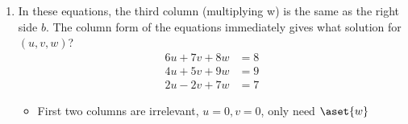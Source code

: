 \begin{itemize}
\begin{enumerate}[resume]
      \item In these equations, the third column (multiplying w) is the same as
        the right side \(b\). The column form of the equations immediately
        gives what solution for \((u,v,w)\)?
        \begin{align*}
          6u + 7v + 8w &= 8 \\
          4u + 5v + 9w &= 9 \\
          2u - 2v + 7w &= 7
        \end{align*}
        \begin{itemize}\color{foreground}
          \item First two columns are irrelevant, \( u = 0, v = 0 \), only need \( \aset{w} \)
        \end{itemize}

  \end{enumerate}
\end{itemize}

